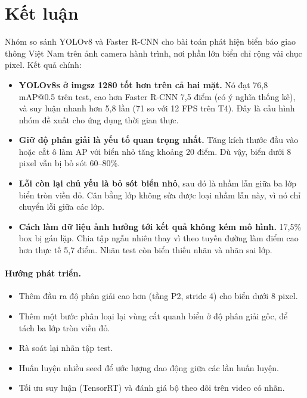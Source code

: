
\section{Kết luận}
\label{sec:conclusion}

Nhóm so sánh YOLOv8 và Faster R-CNN cho bài toán phát hiện biển báo giao thông Việt Nam trên ảnh camera hành trình, nơi phần lớn biển chỉ rộng vài chục pixel.
Kết quả chính:
\begin{itemize}
\item \textbf{YOLOv8s ở imgsz 1280 tốt hơn trên cả hai mặt.} Nó đạt 76,8 mAP@0.5 trên test, cao hơn Faster R-CNN 7,5 điểm (có ý nghĩa thống kê), và suy luận nhanh hơn 5,8 lần (71 so với 12 FPS trên T4). Đây là cấu hình nhóm đề xuất cho ứng dụng thời gian thực.
\item \textbf{Giữ độ phân giải là yếu tố quan trọng nhất.} Tăng kích thước đầu vào hoặc cắt ô làm AP với biển nhỏ tăng khoảng 20 điểm. Dù vậy, biển dưới 8 pixel vẫn bị bỏ sót 60--80\%.
\item \textbf{Lỗi còn lại chủ yếu là bỏ sót biển nhỏ}, sau đó là nhầm lẫn giữa ba lớp biển tròn viền đỏ. Cân bằng lớp không sửa được loại nhầm lẫn này, vì nó chỉ chuyển lỗi giữa các lớp.
\item \textbf{Cách làm dữ liệu ảnh hưởng tới kết quả không kém mô hình.} 17,5\% box bị gán lặp. Chia tập ngẫu nhiên thay vì theo tuyến đường làm điểm cao hơn thực tế 5,7 điểm. Nhãn test còn biển thiếu nhãn và nhãn sai lớp.
\end{itemize}

\paragraph{Hướng phát triển.}
\begin{itemize}
\item Thêm đầu ra độ phân giải cao hơn (tầng P2, stride 4) cho biển dưới 8 pixel.
\item Thêm một bước phân loại lại vùng cắt quanh biển ở độ phân giải gốc, để tách ba lớp tròn viền đỏ.
\item Rà soát lại nhãn tập test.
\item Huấn luyện nhiều seed để ước lượng dao động giữa các lần huấn luyện.
\item Tối ưu suy luận (TensorRT) và đánh giá bộ theo dõi trên video có nhãn.
\end{itemize}
